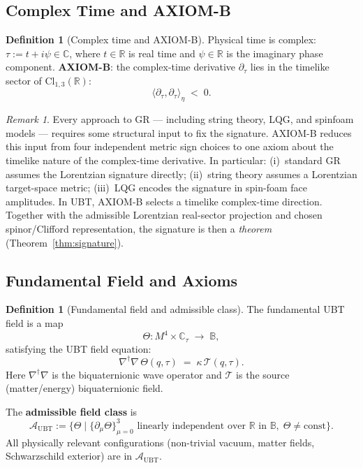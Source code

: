 \documentclass[12pt,a4paper]{article}
\theoremstyle{definition}
\newtheorem{definition}[theorem]{Definition}
\theoremstyle{remark}
\newtheorem{remark}[theorem]{Remark}
\newcommand{\BB}{\mathbb{B}}
\newcommand{\CC}{\mathbb{C}}
\newcommand{\RR}{\mathbb{R}}
\newcommand{\calA}{\mathcal{A}}
\newcommand{\calT}{\mathcal{T}}
\begin{document}
\subsection{Complex Time and AXIOM-B}

\begin{definition}[Complex time and AXIOM-B]
\label{def:axiomb}
Physical time is complex: $\tau := t + i\psi \in \CC$,
where $t \in \RR$ is real time and $\psi \in \RR$ is the imaginary phase component.
\textbf{AXIOM-B}: the complex-time derivative $\partial_\tau$ lies in the
timelike sector of $\mathrm{Cl}_{1,3}(\RR)$:
\[
  \langle\partial_\tau,\partial_\tau\rangle_\eta \;<\; 0.
\]
\end{definition}

\begin{remark}
Every approach to GR — including string theory, LQG, and spinfoam models —
requires some structural input to fix the signature.
AXIOM-B reduces this input from four independent metric sign choices to one
axiom about the timelike nature of the complex-time derivative.
In particular:
(i)~standard GR assumes the Lorentzian signature directly;
(ii)~string theory assumes a Lorentzian target-space metric;
(iii)~LQG encodes the signature in spin-foam face amplitudes.
In UBT, AXIOM-B selects a timelike complex-time direction.
Together with the admissible Lorentzian real-sector projection and chosen
spinor/Clifford representation, the signature is then a
\emph{theorem} (Theorem~\ref{thm:signature}).
\end{remark}

\subsection{Fundamental Field and Axioms}

\begin{definition}[Fundamental field and admissible class]
\label{def:theta}
The fundamental UBT field is a map
\[
  \Theta : M^4 \times \CC_\tau \;\longrightarrow\; \BB,
\]
satisfying the UBT field equation:
\[
  \nabla^\dagger\nabla\,\Theta(q,\tau) \;=\; \kappa\,\calT(q,\tau).
\]
Here $\nabla^\dagger\nabla$ is the biquaternionic wave operator and
$\calT$ is the source (matter/energy) biquaternionic field.

The \textbf{admissible field class} is
\[
  \calA_{\mathrm{UBT}} :=
  \bigl\{\Theta \;\big|\; \{\partial_\mu\Theta\}_{\mu=0}^3
  \text{ linearly independent over } \RR \text{ in } \BB,\;
  \Theta \neq \mathrm{const}\bigr\}.
\]
All physically relevant configurations (non-trivial vacuum, matter fields,
Schwarzschild exterior) are in $\calA_{\mathrm{UBT}}$.
\end{definition}
\end{document}
